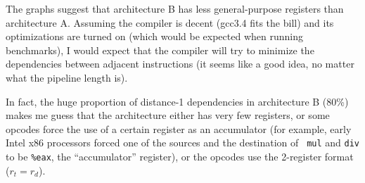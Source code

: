 The graphs suggest that architecture B has less general-purpose registers than
architecture A. Assuming the compiler is decent (gcc3.4 fits the bill) and its
optimizations are turned on (which would be expected when running benchmarks),
I would expect that the compiler will try to minimize the dependencies between
adjacent instructions (it seems like a good idea, no matter what the pipeline
length is).

In fact, the huge proportion of distance-1 dependencies in architecture B (80\%)
makes me guess that the architecture either has very few registers, or some
opcodes force the use of a certain register as an accumulator (for example,
early Intel x86 processors forced one of the sources and the destination of {\tt
mul} and {\tt div} to be {\tt \%eax}, the ``accumulator'' register), or the
opcodes use the 2-register format ($r_t = r_d$).
